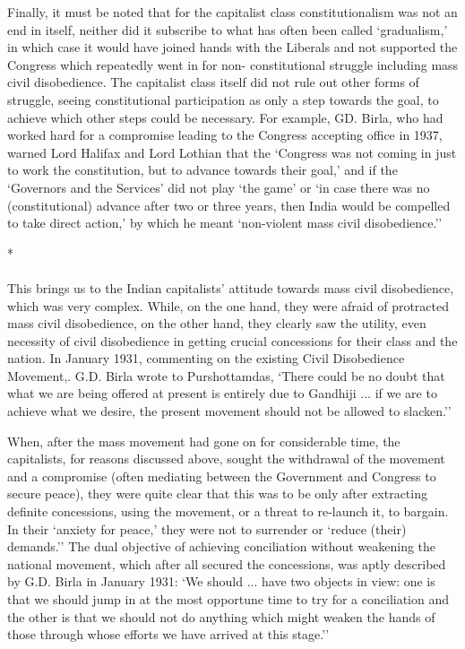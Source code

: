 Finally, it must be noted that for the capitalist class constitutionalism was not an end in itself, neither did it subscribe to what has often been called `gradualism,' in which case it would have joined hands with the Liberals and not supported the Congress which repeatedly went in for non- constitutional struggle including mass civil disobedience. The capitalist class itself did not rule out other forms of struggle, seeing constitutional participation as only a step towards the goal, to achieve which other steps could be necessary. For example, GD. Birla, who had worked hard for a compromise leading to the Congress accepting office in 1937, warned Lord Halifax and Lord Lothian that the `Congress was not coming in just to work the constitution, but to advance towards their goal,' and if the `Governors and the Services' did not play `the game' or `in case there was no (constitutional) advance after two or three years, then India would be compelled to take direct action,' by which he meant `non-violent mass civil disobedience.''

\begin{center}*\end{center}

\paragraph*{}

This brings us to the Indian capitalists' attitude towards mass civil disobedience, which was very complex. While, on the one hand, they were afraid of protracted mass civil disobedience, on the other hand, they clearly saw the utility, even necessity of civil disobedience in getting crucial concessions for their class and the nation. In January 1931, commenting on the existing Civil Disobedience Movement,. G.D. Birla wrote to Purshottamdas, `There could be no doubt that what we are being offered at present is entirely due to Gandhiji ... if we are to achieve what we desire, the present movement should not be allowed to slacken.'' 

When, after the mass movement had gone on for considerable time, the capitalists, for reasons discussed above, sought the withdrawal of the movement and a compromise (often mediating between the Government and Congress to secure peace), they were quite clear that this was to be only after extracting definite concessions, using the movement, or a threat to re-launch it, to bargain. In their `anxiety for peace,' they were not to surrender or `reduce (their) demands.'' The dual objective of achieving conciliation without weakening the national movement, which after all secured the concessions, was aptly described by G.D. Birla in January 1931: `We should ... have two objects in view: one is that we should jump in at the most opportune time to try for a conciliation and the other is that we should not do anything which might weaken the hands of those through whose efforts we have arrived at this stage.'' 

